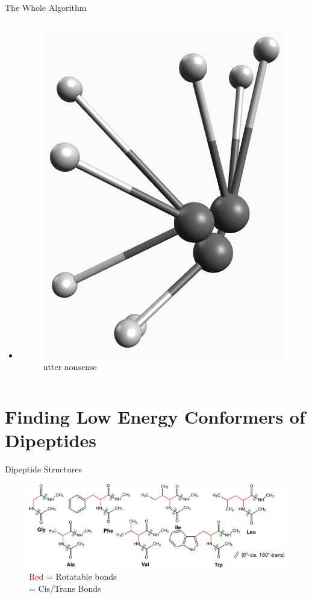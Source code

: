 \documentclass[10pt]{beamer}
\begin{document}
\begin{frame}{The Whole Algorithm}
\begin{columns}[c]
\begin{column}{0.48\textwidth}
\begin{itemize}
{				}
			    \item[]{
			    	\begin{figure}
					    \includegraphics[width=0.6\linewidth]{images/nonsense.png}
					    \caption*{utter nonsense}
					\end{figure}
				}
			\end{itemize}
		\end{column}
	\end{columns}
\end{frame}

\section{Finding Low Energy Conformers of Dipeptides}

{%
\begin{frame}{Dipeptide Structures}
   	\begin{figure}
   		\includegraphics[width=\linewidth]{images/Supady2.jpeg}
   		\caption*{\textcolor{red}{Red} = Rotatable bonds \\
		   		  \textbf{\textcolor{darkgreen}{\ce{<=>}}} = Cis/Trans Bonds
		   		  }
   	\end{figure}
\end{frame}
}
\end{document}
